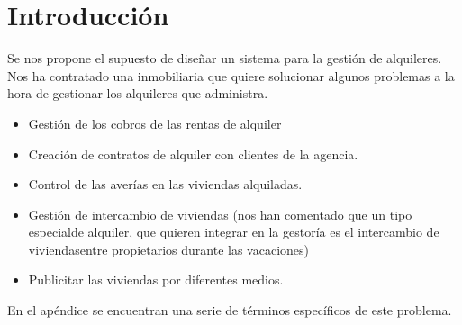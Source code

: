 \chapter{Introducción}

Se nos propone el supuesto de diseñar un sistema para la gestión de alquileres. Nos ha contratado una inmobiliaria que quiere solucionar algunos problemas a la hora de gestionar los alquileres que administra.

\begin{itemize}
	\item Gestión de los cobros de las rentas de alquiler
	\item Creación de contratos de alquiler con clientes de la agencia.
	\item Control de las averías en las viviendas alquiladas.
	\item Gestión de intercambio de viviendas (nos han comentado que un tipo especialde alquiler, que quieren integrar en la gestoría es el intercambio de viviendasentre propietarios durante las vacaciones)
	\item Publicitar las viviendas por diferentes medios.
\end{itemize}

En el apéndice se encuentran una serie de términos específicos de este problema.